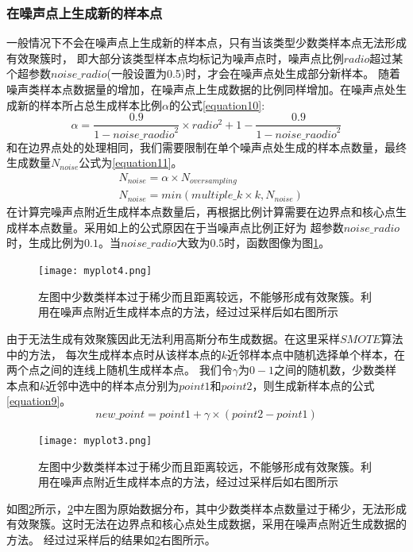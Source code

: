 \documentclass{article}
\begin{document}
\subsubsection{在噪声点上生成新的样本点}
一般情况下不会在噪声点上生成新的样本点，只有当该类型少数类样本点无法形成有效聚簇时，
即大部分该类型样本点均标记为噪声点时，噪声点比例$radio$超过某个超参数$noise\_radio$(一般设置为0.5)时，才会在噪声点处生成部分新样本。
随着噪声类样本点数据量的增加，在噪声点上生成数据的比例同样增加。在噪声点处生成新的样本所占总生成样本比例$\alpha$的公式\ref{equation10}:
\begin{equation}
  \label{equation10}
  \alpha=\frac{0.9}{1-{noise\_raodio}^2}\times radio^2+1-\frac{0.9}{1-{noise\_raodio}^2}
\end{equation}
和在边界点处的处理相同，我们需要限制在单个噪声点处生成的样本点数量，最终生成数量$N_{noise}$公式为\ref{equation11}。
\begin{equation}
  \label{equation11}
  \begin{aligned}
   &  N_{noise}=\alpha \times N_{oversampling} \\
   & N_{noise}=min(multiple\_k \times k, N_{noise})
  \end{aligned}
\end{equation}
在计算完噪声点附近生成样本点数量后，再根据比例计算需要在边界点和核心点生成样本点数量。采用如上的公式原因在于当噪声点比例正好为
超参数$noise\_radio$时，生成比例为$0.1$。当$noise\_radio$大致为0.5时，函数图像为图\ref{fig4}。
\begin{figure}
  \centering
  \texttt{[image: myplot4.png]}
  \caption{左图中少数类样本过于稀少而且距离较远，不能够形成有效聚簇。利用在噪声点附近生成样本点的方法，经过过采样后如右图所示}
  \label{fig4}
\end{figure}
由于无法生成有效聚簇因此无法利用高斯分布生成数据。在这里采样$SMOTE$算法中的方法，
每次生成样本点时从该样本点的$k$近邻样本点中随机选择单个样本，在两个点之间的连线上随机生成样本点。
我们令$\gamma$为$0-1$之间的随机数，少数类样本点和$k$近邻中选中的样本点分别为$point1$和$point2$，则生成新样本点的公式\ref{equation9}。
\begin{equation}
  \label{equation9}
  new\_point=point1+\gamma \times (point2-point1)
\end{equation}
\begin{figure}
  \centering
  \texttt{[image: myplot3.png]}
  \caption{左图中少数类样本过于稀少而且距离较远，不能够形成有效聚簇。利用在噪声点附近生成样本点的方法，经过过采样后如右图所示}
  \label{fig3}
\end{figure}
如图\ref{fig3}所示，\ref{fig3}中左图为原始数据分布，其中少数类样本点数量过于稀少，无法形成有效聚簇。这时无法在边界点和核心点处生成数据，采用在噪声点附近生成数据的方法。
经过过采样后的结果如\ref{fig3}右图所示。
\end{document}
